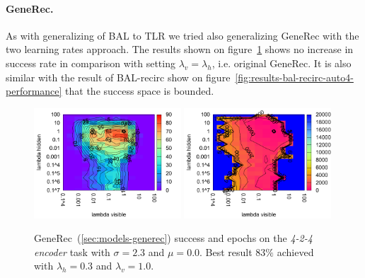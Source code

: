 \paragraph{GeneRec.} 
As with generalizing of BAL to TLR we tried also generalizing GeneRec with the two learning rates approach. The results shown on figure~\ref{fig:results-generec-auto4-performance} shows no increase in success rate in comparison with setting $\lambda_v = \lambda_h$, i.e. original GeneRec. It is also similar with the result of BAL-recirc show on figure~\ref{fig:results-bal-recirc-auto4-performance} that the success space is bounded.  
\begin{figure}[H]
  \centering
  \includegraphics[width=0.49\textwidth]{img/generec-auto4-success.pdf}   
  \includegraphics[width=0.49\textwidth]{img/generec-auto4-epoch.pdf}     
  \caption{GeneRec~(\ref{sec:models-generec}) success and epochs on the \emph{4-2-4 encoder} task with $\sigma = 2.3$ and $\mu = 0.0$. Best result $83\%$ achieved with $\lambda_h = 0.3$ and $\lambda_v=1.0$.}
  \label{fig:results-generec-auto4-performance}
\end{figure}



